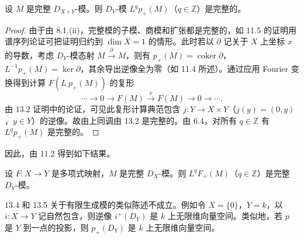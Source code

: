 \begin{lemma}
设 $M$ 是完整 $D_{X\times Y}$-模。则 $D_Y$-模 $L^qp_+(M)$（$q\in\mathbb{Z}$）是完整的。
\end{lemma}

\begin{proof}
由于由 8.1.(ii)，完整模的子模、商模和扩张都是完整的，如 11.5 的证明用谱序列论证可把证明归约到 $\dim X=1$ 的情形。此时若以 $\partial$ 记关于 $X$ 上坐标 $x$ 的导数，考虑 $D_Y$-模态射 $M\xrightarrow{\ \partial\ }M$，则有 $p_+(M)=\operatorname{coker}\partial$，$L^{-1}p_+(M)=\ker\partial$，其余导出逆像全为零（如 11.4 所述）。通过应用 Fourier 变换得到计算 $F(L_\cdot p_+(M))$ 的复形
$$\cdots\longrightarrow 0\longrightarrow F(M)\xrightarrow{\ x\ }F(M)\longrightarrow 0\longrightarrow\cdots.$$
由 13.2 证明中的论证，可见此复形计算典范包含 $j:Y\to X\times Y$（$j(y)=(0,y)$，$y\in Y$）的逆像。故由上同调由 13.2 是完整的。由 6.4，对所有 $q\in\mathbb{Z}$ 有 $L^q p_+(M)$ 是完整的。
\end{proof}

因此，由 11.2 得到如下结果。

\begin{theorem}
设 $F:X\to Y$ 是多项式映射，$M$ 是完整 $D_X$-模。则 $L^qF_+(M)$（$q\in\mathbb{Z}$）是完整 $D_Y$-模。
\end{theorem}

\begin{remark}
13.4 和 13.5 关于有限生成模的类似陈述不成立。例如令 $X=\{0\}$，$Y=k$，以 $i:X\to Y$ 记自然包含，则逆像 $i^+(D_Y)$ 是 $k$ 上无限维向量空间。类似地，若 $p$ 是 $Y$ 到一点的投影，则 $p_+(D_Y)$ 是 $k$ 上无限维向量空间。
\end{remark}
